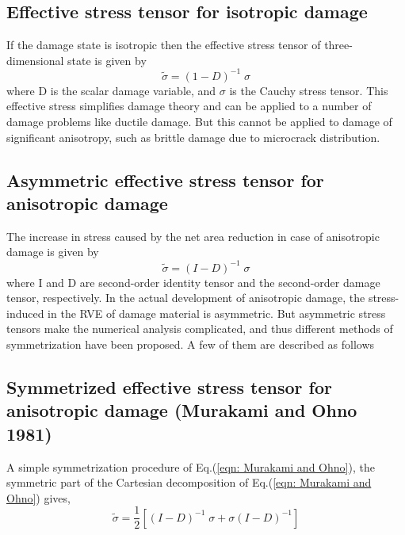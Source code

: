 \documentclass[12pt,twoside]{report}
\begin{document}
\subsection{Effective stress tensor for isotropic damage}
\indent\indent\indent If the damage state is isotropic then the effective stress tensor of three-dimensional state is given by
\begin{equation}
\tilde{\sigma} = (1 - D)^{-1} \; \sigma
\end{equation}
where D is the scalar damage variable, and $\sigma$ is the Cauchy stress tensor. This effective stress simplifies damage theory and can be applied to a number of damage problems like ductile damage. But this cannot be applied to damage of significant anisotropy, such as brittle damage due to microcrack distribution.\\
\subsection{Asymmetric effective stress tensor for anisotropic damage}
\indent\indent\indent The increase in stress caused by the net area reduction in case of anisotropic damage is given by
\begin{equation}
\tilde{\sigma} = (I - D)^{-1} \; \sigma
\end{equation}
where I and D are second-order identity tensor and the second-order damage tensor, respectively. In the actual development of anisotropic damage, the stress-induced in the RVE of damage material is asymmetric. But asymmetric stress tensors make the numerical analysis complicated, and thus different methods of symmetrization have been proposed. A few of them are described as follows

\subsection{Symmetrized effective stress tensor for anisotropic damage (Murakami and Ohno 1981)} 
\indent\indent\indent A simple symmetrization procedure of Eq.(\ref{eqn: Murakami and Ohno}), the symmetric part of the Cartesian decomposition of Eq.(\ref{eqn: Murakami and Ohno}) gives,
\begin{equation}
\label{eqn: Murakami and Ohno}
\tilde{\sigma} = \frac{1}{2} [(I - D)^{-1}\;\sigma + \sigma(I - D)^{-1}]
\end{equation}\\
\end{document}
